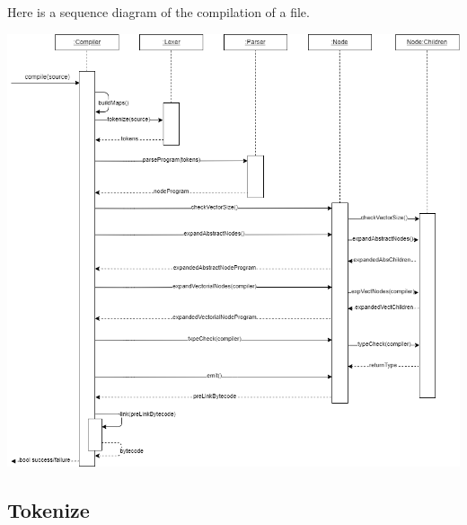 \documentclass{scrbook}
\begin{document}
Here is a sequence diagram of the compilation of a file.
\begin{center}
  \includegraphics[width=\textwidth]{./compiler_sequence_diagram}
\end{center}

\subsection{Tokenize}
\end{document}
